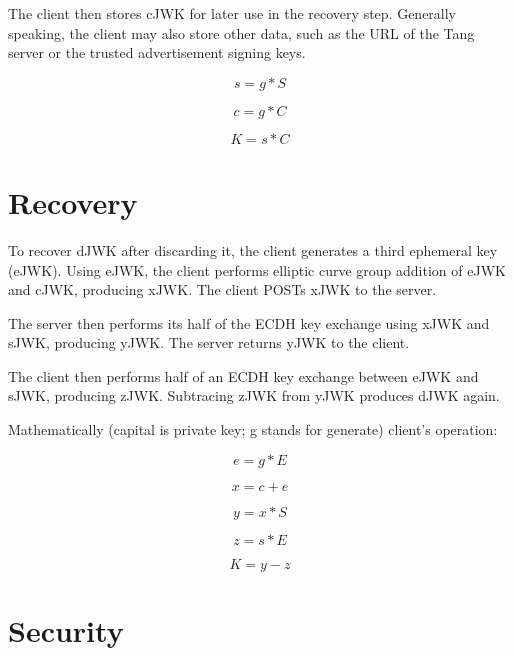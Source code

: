 \documentclass[../xdudla00-porting-Tang-to-Open-WRT.tex]{subfiles}
\begin{document}
The client then stores cJWK for later use in the recovery step.
Generally speaking, the client may also store other data, such as the URL of the Tang server or the trusted advertisement signing keys.

\begin{equation}
    s = g * S
\end{equation}

\begin{equation}
    c = g * C
\end{equation}

\begin{equation}
    K = s * C
\end{equation}

\section{Recovery}
To recover dJWK after discarding it, the client generates a third ephemeral key (eJWK).
Using eJWK, the client performs elliptic curve group addition of eJWK and cJWK, producing xJWK. The client POSTs xJWK to the server.

The server then performs its half of the ECDH key exchange using xJWK and sJWK, producing yJWK. The server returns yJWK to the client.

The client then performs half of an ECDH key exchange between eJWK and sJWK, producing zJWK. Subtracing zJWK from yJWK produces dJWK again.

Mathematically (capital is private key; g stands for generate) client's operation:

\begin{equation}
    e = g * E
\end{equation}

\begin{equation}
    x = c + e
\end{equation}

\begin{equation}
    y = x * S
\end{equation}

\begin{equation}
    z = s * E
\end{equation}

\begin{equation}
    K = y - z
\end{equation}

\section{Security}
\end{document}
